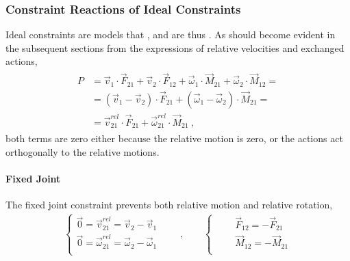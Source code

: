\documentclass[letterpaper,10pt,english]{jupyterBook}
\begin{document}
\subsubsection{Constraint Reactions of Ideal Constraints}
\label{\detokenize{ch/actions-reactions:constraint-reactions-of-ideal-constraints}}\label{\detokenize{ch/actions-reactions:classical-mechanics-actions-reactions-contact-ideal}}
\sphinxAtStartPar
Ideal constraints are models that , and are thus . As should become evident in the subsequent sections from the expressions of relative velocities and exchanged actions,
\begin{equation*}
\begin{split}\begin{aligned}
P & = \vec{v}_1     \cdot \vec{F}_{21} + \vec{v}_2     \cdot \vec{F}_{12} 
    + \vec{\omega}_1 \cdot \vec{M}_{21} + \vec{\omega}_2 \cdot \vec{M}_{12} = \\ 
  & = ( \vec{v}_1 - \vec{v}_2 ) \cdot \vec{F}_{21}
    + ( \vec{\omega}_1 - \vec{\omega}_2 ) \cdot \vec{M}_{21} = \\ 
  & = \vec{v}^{rel}_{21} \cdot \vec{F}_{21}
    + \vec{\omega}^{rel}_{21} \cdot \vec{M}_{21} \ ,
\end{aligned}\end{split}
\end{equation*}
\sphinxAtStartPar
both terms are zero either because the relative motion is zero, or the actions act orthogonally to the relative motions.


\paragraph{Fixed Joint}
\label{\detokenize{ch/actions-reactions:fixed-joint}}
\sphinxAtStartPar
The fixed joint constraint prevents both relative motion and relative rotation,
\begin{equation*}
\begin{split}
\begin{cases}
  \vec{0} = \vec{v}^{rel}_{21}     = \vec{v}_{2}     - \vec{v}_{1} \\
  \vec{0} = \vec{\omega}^{rel}_{21} = \vec{\omega}_{2} - \vec{\omega}_{1} \\
\end{cases}
\qquad , \qquad
\begin{cases}
  \qquad \vec{F}_{12} = - \vec{F}_{21} \\
  \qquad \vec{M}_{12} = - \vec{M}_{21} \\
\end{cases}
\end{split}
\end{equation*}
\end{document}
